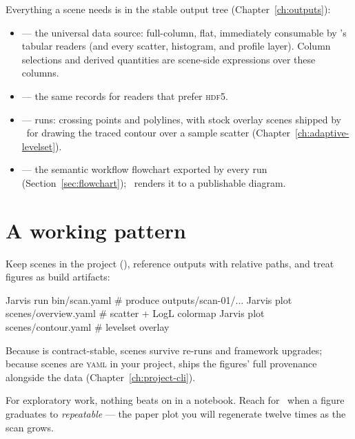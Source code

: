 Everything a scene needs is in the stable output tree (Chapter~\ref{ch:outputs}):

\begin{itemize}
  \item {} --- the universal data source: full-column,
        flat, immediately consumable by \JPlot's tabular readers (and every scatter,
        histogram, and profile layer). Column selections and derived quantities are
        scene-side expressions over these columns.
  \item {} --- the same records for readers that prefer
        \textsc{hdf5}.
  \item {} ---  runs: crossing points and
        polylines, with stock overlay scenes shipped by \JPlot\ for drawing the traced
        contour over a sample scatter (Chapter~\ref{ch:adaptive-levelset}).
  \item {} --- the semantic workflow flowchart
        exported by every run (Section~\ref{sec:flowchart}); \JPlot\ renders it to a
        publishable diagram.
\end{itemize}

\section{A working pattern}
\label{sec:plot-pattern}

Keep scenes in the project (), reference outputs with relative paths,
and treat figures as build artifacts:

\begin{terminal}
\begin{jcmd}
Jarvis run bin/scan.yaml           # produce outputs/scan-01/...
Jarvis plot scenes/overview.yaml   # scatter + LogL colormap
Jarvis plot scenes/contour.yaml    # levelset overlay
\end{jcmd}
\end{terminal}

Because  is contract-stable, scenes survive re-runs and framework
upgrades; because scenes are \textsc{yaml} in your project, 
ships the figures' full provenance alongside the data
(Chapter~\ref{ch:project-cli}).

\begin{jtip}
For exploratory work, nothing beats  on  in a notebook.
Reach for \JPlot\ when a figure graduates to \emph{repeatable} --- the paper plot you
will regenerate twelve times as the scan grows.
\end{jtip}

